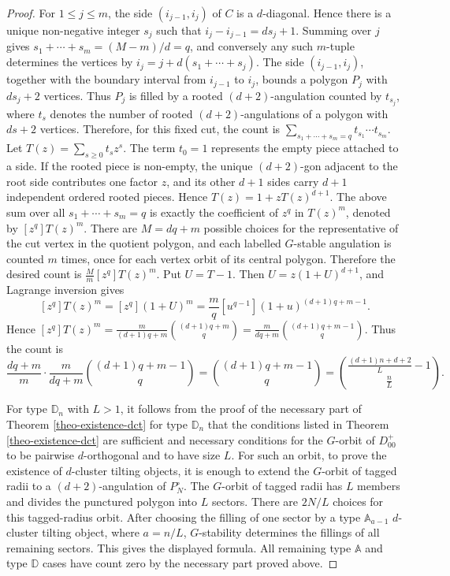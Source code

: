 \documentclass[12pt]{article}
\theoremstyle{plain}
\theoremstyle{definition}
\renewcommand{\leq}{\leqslant}
\renewcommand{\geq}{\geqslant}
\begin{document}
\begin{proof}
For \(1\leq j\leq m\), the side \((i_{j-1},i_j)\) of \(C\) is a \(d\)-diagonal.
Hence there is a unique non-negative integer \(s_j\) such that
\(i_j-i_{j-1}=ds_j+1\).
Summing over \(j\) gives
\(s_1+\cdots+s_m=(M-m)/d=q\), and conversely any such \(m\)-tuple determines
the vertices by \(i_j=j+d(s_1+\cdots+s_j)\).  The side
\((i_{j-1},i_j)\), together with the boundary interval from \(i_{j-1}\) to
\(i_j\), bounds a polygon \(P_j\) with \(ds_j+2\) vertices.  Thus \(P_j\) is
filled by a rooted \((d+2)\)-angulation counted by \(t_{s_j}\), where \(t_s\)
denotes the number of rooted \((d+2)\)-angulations of a polygon with \(ds+2\)
vertices.  Therefore, for this fixed cut, the count is
\(\sum_{s_1+\cdots+s_m=q}t_{s_1}\cdots t_{s_m}\). Let \(T(z)=\sum_{s\geq0}t_s z^s\).  The term \(t_0=1\) represents the empty
piece attached to a side.  If the rooted piece is non-empty, the unique
\((d+2)\)-gon adjacent to the root side contributes one factor \(z\), and its
other \(d+1\) sides carry \(d+1\) independent ordered rooted pieces.  Hence
\(T(z)=1+zT(z)^{d+1}\).  The above sum over all
\(s_1+\cdots+s_m=q\) is exactly the coefficient of $z^q$ in \(T(z)^m\), denoted by $[z^q]T(z)^m$. There are \(M=dq+m\) possible choices for the representative of the cut vertex
in the quotient polygon, and each labelled \(G\)-stable angulation is counted
\(m\) times, once for each vertex orbit of its central polygon.  Therefore the
desired count is \(\frac{M}{m}[z^q]T(z)^m\).  Put \(U=T-1\).  Then
\(U=z(1+U)^{d+1}\), and Lagrange inversion gives
\[[z^q]T(z)^m=[z^q](1+U)^m=\frac{m}{q}[u^{q-1}](1+u)^{(d+1)q+m-1}.\]
Hence
\([z^q]T(z)^m=\frac{m}{(d+1)q+m}\binom{(d+1)q+m}{q}
=\frac{m}{dq+m}\binom{(d+1)q+m-1}{q}.\)
Thus the count is
\[
\frac{dq+m}{m}\cdot
\frac{m}{dq+m}\binom{(d+1)q+m-1}{q}
=
\binom{(d+1)q+m-1}{q}
=
\binom{\frac{(d+1)n+d+2}{L}-1}{\frac nL}.
\]


For type \(\mathbb D_n\) with \(L>1\), it follows from the proof of the necessary part of Theorem \ref{theo-existence-dct} for type $\mathbb{D}_n$ that the conditions listed in Theorem \ref{theo-existence-dct} are sufficient and necessary conditions for the $G$-orbit of $D_{00}^{+}$ to be pairwise $d$-orthogonal and to have size $L$. For such an orbit, to prove the existence of $d$-cluster tilting objects, it is enough to extend the $G$-orbit of tagged radii to a $(d+2)$-angulation of $P_N^{\circ}$. The
\(G\)-orbit of tagged radii has \(L\) members and divides the punctured polygon
into \(L\) sectors.  There are \(2N/L\) choices for this tagged-radius orbit.
After choosing the filling of one sector by a type \(\mathbb A_{a-1}\)
\(d\)-cluster tilting object, where \(a=n/L\), \(G\)-stability determines the
fillings of all remaining sectors.  This gives the displayed formula.
All remaining type \(\mathbb A\) and type \(\mathbb D\) cases have count zero
by the necessary part proved above.


\end{proof}
\end{document}
